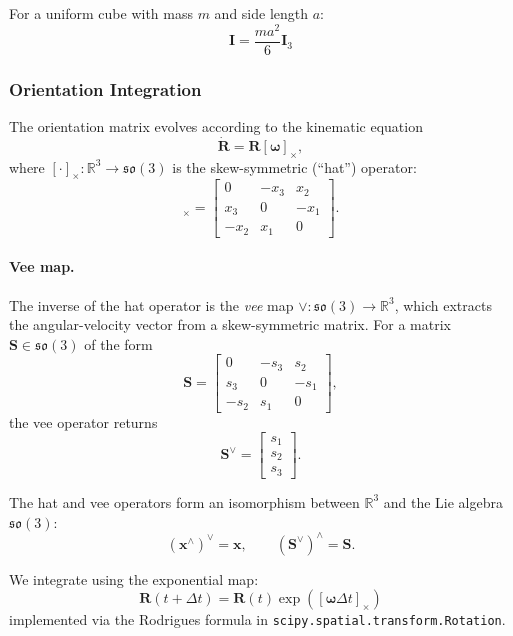 \documentclass[12pt,a4paper]{article}
\begin{document}
For a uniform cube with mass $m$ and side length $a$:
\begin{equation}
    \mathbf{I} = \frac{ma^2}{6}\mathbf{I}_3
    \label{eq:cube_inertia}
\end{equation}

\subsubsection{Orientation Integration}

The orientation matrix evolves according to the kinematic equation
\begin{equation}
    \dot{\mathbf{R}} = \mathbf{R}[\boldsymbol{\omega}]_\times,
\end{equation}
where $[\cdot]_\times : \mathbb{R}^3 \to \mathfrak{so}(3)$ is the skew-symmetric (``hat'') operator:
\begin{equation}
    [\mathbf{x}]_\times =
    \begin{bmatrix}
        0 & -x_3 & x_2 \\
        x_3 & 0 & -x_1 \\
        -x_2 & x_1 & 0
    \end{bmatrix}.
\end{equation}

\paragraph{Vee map.}
The inverse of the hat operator is the \emph{vee} map
$\vee : \mathfrak{so}(3) \to \mathbb{R}^3$, which extracts the
angular-velocity vector from a skew-symmetric matrix.
For a matrix $\mathbf{S} \in \mathfrak{so}(3)$ of the form
\[
\mathbf{S} =
\begin{bmatrix}
    0 & -s_3 & s_2 \\
    s_3 & 0 & -s_1 \\
    -s_2 & s_1 & 0
\end{bmatrix},
\]
the vee operator returns
\[
\mathbf{S}^\vee = 
\begin{bmatrix}
    s_1 \\ s_2 \\ s_3
\end{bmatrix}.
\]

The hat and vee operators form an isomorphism between
$\mathbb{R}^3$ and the Lie algebra $\mathfrak{so}(3)$:
\[
(\mathbf{x}^\wedge)^\vee = \mathbf{x}, \qquad
(\mathbf{S}^\vee)^\wedge = \mathbf{S}.
\]

We integrate using the exponential map:
\begin{equation}
    \mathbf{R}(t + \Delta t) = \mathbf{R}(t) \exp([\boldsymbol{\omega}\Delta t]_\times)
    \label{eq:rotation_integration}
\end{equation}
implemented via the Rodrigues formula in \texttt{scipy.spatial.transform.Rotation}.
\end{document}
